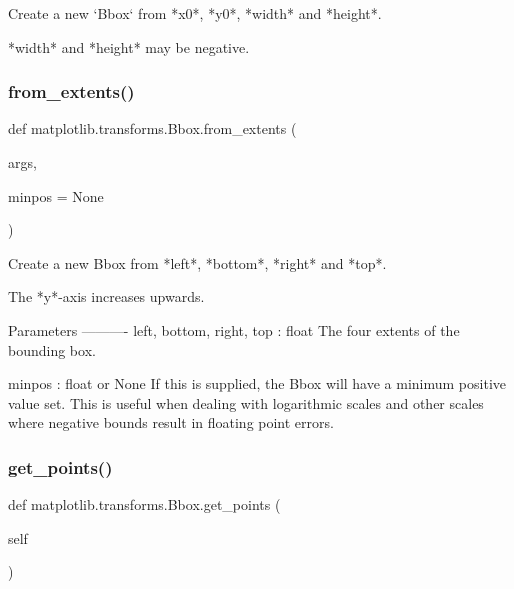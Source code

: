 \begin{DoxyVerb}Create a new `Bbox` from *x0*, *y0*, *width* and *height*.

*width* and *height* may be negative.
\end{DoxyVerb}
 \mbox{\label{classmatplotlib_1_1transforms_1_1Bbox_a72b35a14dbf28b8afad449dd64dcfaf8}} 
\subsubsection{\texorpdfstring{from\+\_\+extents()}{from\_extents()}}
{\footnotesize\ttfamily def matplotlib.\+transforms.\+Bbox.\+from\+\_\+extents (\begin{DoxyParamCaption}\item[{}]{args,  }\item[{}]{minpos = {\ttfamily None} }\end{DoxyParamCaption})\hspace{0.3cm}{\ttfamily [static]}}

\begin{DoxyVerb}Create a new Bbox from *left*, *bottom*, *right* and *top*.

The *y*-axis increases upwards.

Parameters
----------
left, bottom, right, top : float
    The four extents of the bounding box.

minpos : float or None
   If this is supplied, the Bbox will have a minimum positive value
   set. This is useful when dealing with logarithmic scales and other
   scales where negative bounds result in floating point errors.
\end{DoxyVerb}
 \mbox{\label{classmatplotlib_1_1transforms_1_1Bbox_ace8a406ed2658e19b2724dc032cac84e}} 
\subsubsection{\texorpdfstring{get\+\_\+points()}{get\_points()}}
{\footnotesize\ttfamily def matplotlib.\+transforms.\+Bbox.\+get\+\_\+points (\begin{DoxyParamCaption}\item[{}]{self }\end{DoxyParamCaption})}

